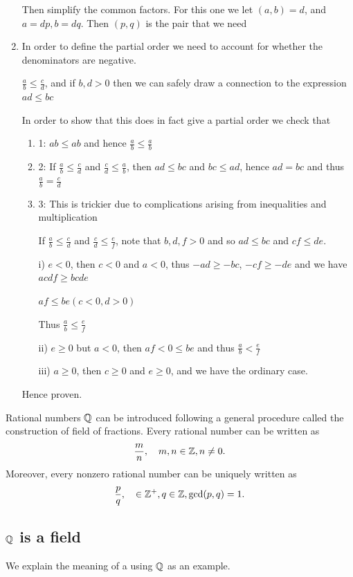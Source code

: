 \begin{solution}
\begin{enumerate}[label=(\alph*)]
Then simplify the common factors. For this one we let $(a,b)=d$, and $a=dp,b=dq$. Then $(p,q)$ is the pair that we need

\item In order to define the partial order we need to account for whether the denominators are negative.

$\frac{a}{b} \le \frac{c}{d}$, and if $b,d>0$ then we can safely draw a connection to the expression $ad \le bc$

In order to show that this does in fact give a partial order we check that
\begin{enumerate}
\item 1: $ab \le ab$ and hence $\frac{a}{b} \le \frac{a}{b}$

\item 2: If $\frac{a}{b} \le \frac{c}{d}$ and $\frac{c}{d} \le \frac{a}{b}$, then $ad \le bc$ and $bc \le ad$, hence $ad=bc$ and thus $\frac{a}{b}=\frac{c}{d}$

\item 3: This is trickier due to complications arising from inequalities and multiplication

If $\frac{a}{b}\le\frac{c}{d}$ and $\frac{c}{d}\le\frac{e}{f}$, note that $b,d,f>0$ and so $ad \le bc$ and $cf \le de$.

i) $e<0$, then $c<0$ and $a<0$, thus $-ad \ge -bc$, $-cf \ge -de$ and we have $acdf \ge bcde$

$af \le be (c<0,d>0)$

Thus $\frac{a}{b} \le \frac{e}{f}$

ii) $e \ge 0$ but $a<0$, then $af<0 \le be$ and thus $\frac{a}{b}<\frac{e}{f}$

iii) $a \ge 0$, then $c \ge 0$ and $e \ge 0$, and we have the ordinary case.
\end{enumerate}

Hence proven.
\end{enumerate}
\end{solution}


Rational numbers $\mathbb Q$ can be introduced following a general procedure called the construction of field of fractions. Every rational number can be written as
\[ \frac{m}{n}, \quad m,n\in\mathbb Z,n\neq0. \]
Moreover, every nonzero rational number can be uniquely written as
\[ \frac{p}{q}, \quad \in\mathbb Z^+,q\in\mathbb Z,\gcd(p,q)=1. \]

\subsection{$\mathbb Q$ is a field}
We explain the meaning of a  using $\mathbb Q$ as an example.

